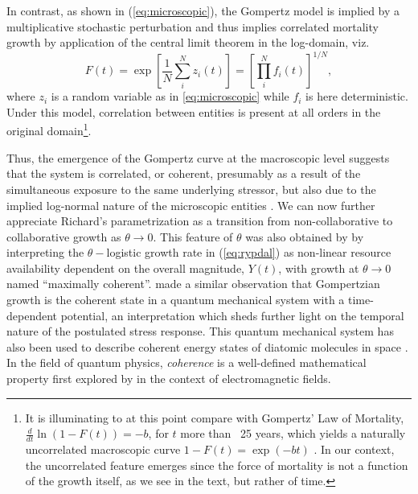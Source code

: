 \documentclass{article}
\begin{document}
In contrast, as shown in (\ref{eq:microscopic}), the Gompertz model is implied by a multiplicative stochastic perturbation and thus implies correlated mortality growth by application of the central limit theorem in the log-domain, viz.
\begin{equation}
F(t) = \exp{\left[\frac{1}{N}\sum_i^N z_i(t)\right]} = \left[\prod_i^N f_i(t)\right]^{1/N},
\end{equation}
where $z_i$ is a random variable as in \ref{eq:microscopic} while $f_i$ is here deterministic. 
Under this model, correlation between entities is present at all orders in the original domain\footnote{It is illuminating to at this point compare with Gompertz' Law of Mortality, $\frac{d}{dt}\ln{(1 - F(t))} = -b$, for $t$ more than ~25 years, which yields a naturally uncorrelated macroscopic curve $1 - F(t) = \exp{(-bt)}$ \citep{shklovskii2005simple}. 
In our context, the uncorrelated feature emerges since the force of mortality is not a function of the growth itself, as we see in the text, but rather of time.}.

Thus, the emergence of the Gompertz curve at the macroscopic level suggests that the system is correlated, or coherent, presumably as a result of the simultaneous exposure to the same underlying stressor, but also due to the implied log-normal nature of the microscopic entities \citep{zhang1994log}.
We can now further appreciate Richard's parametrization as a transition from non-collaborative to collaborative growth as $\theta \rightarrow 0$. 
This feature of $\theta$ was also obtained by \citet{petroni2020logistic} by interpreting the $\theta-$logistic growth rate in (\ref{eq:rypdal}) as non-linear resource availability dependent on the overall magnitude, $Y(t)$, with growth at $\theta \rightarrow 0$ named ``maximally coherent''. 
\citet{molski2003coherent} made a similar observation that Gompertzian growth is the coherent state in a quantum mechanical system with a time-dependent potential, an interpretation which sheds further light on the temporal nature of the postulated stress response.
This quantum mechanical system has also been used to describe coherent energy states of diatomic molecules in space \citep{morse1929diatomic}. 
In the field of quantum physics, \emph{coherence} is a well-defined mathematical property first explored by \citet{glauber1963coherent} in the context of electromagnetic fields.
\end{document}
